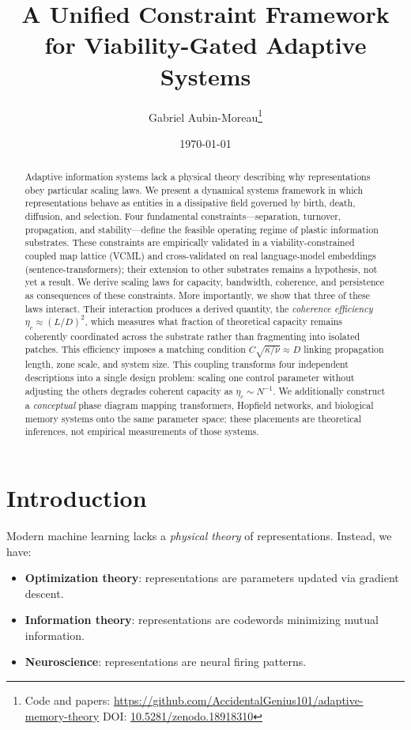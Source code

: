 \documentclass[11pt]{article}
\title{A Unified Constraint Framework for Viability-Gated Adaptive Systems}
\author{Gabriel Aubin-Moreau\thanks{Code and papers: \url{https://github.com/AccidentalGenius101/adaptive-memory-theory} \quad DOI: \href{https://doi.org/10.5281/zenodo.18918310}{10.5281/zenodo.18918310}}}
\date{\today}
\begin{document}
\maketitle

\begin{abstract}
Adaptive information systems lack a physical theory describing why representations obey particular scaling laws. We present a dynamical systems framework in which representations behave as entities in a dissipative field governed by birth, death, diffusion, and selection. Four fundamental constraints---separation, turnover, propagation, and stability---define the feasible operating regime of plastic information substrates. These constraints are empirically validated in a viability-constrained coupled map lattice (VCML) and cross-validated on real language-model embeddings (sentence-transformers); their extension to other substrates remains a hypothesis, not yet a result. We derive scaling laws for capacity, bandwidth, coherence, and persistence as consequences of these constraints. More importantly, we show that three of these laws interact. Their interaction produces a derived quantity, the \emph{coherence efficiency} $\eta_c \approx (L/D)^2$, which measures what fraction of theoretical capacity remains coherently coordinated across the substrate rather than fragmenting into isolated patches. This efficiency imposes a matching condition $C\sqrt{\kappa/\nu} \approx D$ linking propagation length, zone scale, and system size. This coupling transforms four independent descriptions into a single design problem: scaling one control parameter without adjusting the others degrades coherent capacity as $\eta_c \sim N^{-1}$. We additionally construct a \emph{conceptual} phase diagram mapping transformers, Hopfield networks, and biological memory systems onto the same parameter space; these placements are theoretical inferences, not empirical measurements of those systems.
\end{abstract}

\section{Introduction}

Modern machine learning lacks a \emph{physical theory} of representations. Instead, we have:
\begin{itemize}
\item \textbf{Optimization theory}: representations are parameters updated via gradient descent.
\item \textbf{Information theory}: representations are codewords minimizing mutual information.
\item \textbf{Neuroscience}: representations are neural firing patterns.
\end{itemize}
\end{document}
